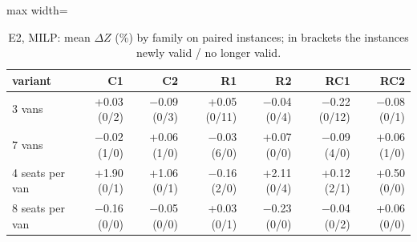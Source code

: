 \begin{table}[H]\centering
\small
\caption{E2, MILP: mean $\Delta Z$ (\%) by family on paired instances; in brackets the instances newly valid / no longer valid.}\label{tab:e2fam}
\begin{adjustbox}{max width=\textwidth}\begin{tabular}{lrrrrrr}\toprule
variant & C1 & C2 & R1 & R2 & RC1 & RC2 \\ \midrule
3 vans & +0.03 (0/2) & $-$0.09 (0/3) & +0.05 (0/11) & $-$0.04 (0/4) & $-$0.22 (0/12) & $-$0.08 (0/1) \\
7 vans & $-$0.02 (1/0) & +0.06 (1/0) & $-$0.03 (6/0) & +0.07 (0/0) & $-$0.09 (4/0) & +0.06 (1/0) \\
4 seats per van & +1.90 (0/1) & +1.06 (0/1) & $-$0.16 (2/0) & +2.11 (0/4) & +0.12 (2/1) & +0.50 (0/0) \\
8 seats per van & $-$0.16 (0/0) & $-$0.05 (0/0) & +0.03 (0/1) & $-$0.23 (0/0) & $-$0.04 (0/2) & +0.06 (0/0) \\
\bottomrule\end{tabular}\end{adjustbox}\end{table}
